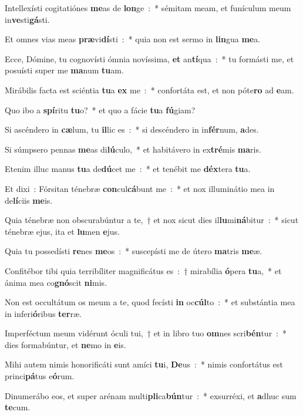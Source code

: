 ﻿\item Intellexísti cogitatiónes \textbf{me}as de \textbf{lon}ge~:~* sémitam meam, et funículum meum in\textbf{ve}sti\textbf{gá}sti.
\item Et omnes vias meas \textbf{præ}vi\textbf{dí}sti~:~* quia non est sermo in \textbf{lin}gua \textbf{me}a.
\item Ecce, Dómine, tu cognovísti ómnia novíssima, \textbf{et} an\textbf{tí}qua~:~* tu formásti me, et posuísti super me \textbf{ma}num \textbf{tu}am.
\item Mirábilis facta est sciéntia \textbf{tu}a \textbf{ex} me~:~* confortáta est, et non póte\textbf{ro} ad \textbf{e}am.
\item Quo ibo a \textbf{spí}ritu \textbf{tu}o?~* et quo a fácie \textbf{tu}a \textbf{fú}giam?
\item Si ascéndero in \textbf{cæ}lum, tu \textbf{il}lic es~:~* si descéndero in in\textbf{fér}num, \textbf{a}des.
\item Si súmpsero pennas \textbf{me}as di\textbf{lú}culo,~* et habitávero in ex\textbf{tré}mis \textbf{ma}ris.
\item Etenim illuc manus \textbf{tu}a de\textbf{dú}cet me~:~* et tenébit me \textbf{déx}tera \textbf{tu}a.
\item Et dixi~: Fórsitan ténebræ \textbf{con}cul\textbf{cá}bunt me~:~* et nox illuminátio mea in de\textbf{lí}ciis \textbf{me}is.
\item Quia ténebræ non obscurabúntur a te,~† et nox sicut dies il\textbf{lu}mi\textbf{ná}bitur~:~* sicut ténebræ ejus, ita et \textbf{lu}men \textbf{e}jus.
\item Quia tu possedísti \textbf{re}nes \textbf{me}os~:~* suscepísti me de útero \textbf{ma}tris \textbf{me}æ.
\item Confitébor tibi quia terribíliter magnificátus es~:~† mirabília \textbf{ó}pera \textbf{tu}a,~* et ánima mea co\textbf{gnó}scit \textbf{ni}mis.
\item Non est occultátum os meum a te, quod fecísti \textbf{in} oc\textbf{cúl}to~:~* et substántia mea in inferi\textbf{ó}ribus \textbf{ter}ræ.
\item Imperféctum meum vidérunt óculi tui,~† et in libro tuo \textbf{om}nes scri\textbf{bén}tur~:~* dies formabúntur, et \textbf{ne}mo in \textbf{e}is.
\item Mihi autem nimis honorificáti sunt amíci \textbf{tu}i, \textbf{De}us~:~* nimis confortátus est princi\textbf{pá}tus e\textbf{ó}rum.
\item Dinumerábo eos, et super arénam mul\-ti\-\textbf{pli}\-ca\-\textbf{bún}\-tur~:~* exsurréxi, et \textbf{a}dhuc sum \textbf{te}cum.
